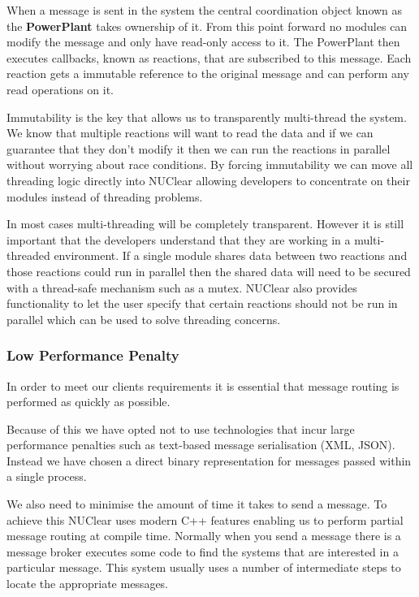 \documentclass[english,12pt]{scrartcl}
\begin{document}
				When a message is sent in the system the central coordination object known as the \textbf{PowerPlant} takes ownership of it. 
				From this point forward no modules can modify the message and only have read-only access to it.
				The PowerPlant then executes callbacks, known as reactions, that are subscribed to this message.
				Each reaction gets a immutable reference to the original message and can perform any read operations on it.
				
				Immutability is the key that allows us to transparently multi-thread the system.
				We know that multiple reactions will want to read the data and if we can guarantee that they don't modify it then we can
				run the reactions in parallel without worrying about race conditions.
				By forcing immutability we can move all threading logic directly into NUClear allowing developers to concentrate on their modules instead of threading problems.
				
				In most cases multi-threading will be completely transparent. 
				However it is still important that the developers understand that they are working in a multi-threaded environment.
				If a single module shares data between two reactions and those reactions could run in parallel then the shared data will
				need to be secured with a thread-safe mechanism such as a mutex.
				NUClear also provides functionality to let the user specify that certain reactions should not be run in parallel which can be used to solve threading concerns.
			
			\subsubsection{Low Performance Penalty}
				In order to meet our clients requirements it is essential that message routing is performed as quickly as possible. 
			
				Because of this we have opted not to use technologies that incur large performance penalties such as text-based message serialisation (XML, JSON).
				Instead we have chosen a direct binary representation for messages passed within a single process. 
				
				We also need to minimise the amount of time it takes to send a message. 
				To achieve this NUClear uses modern C++ features enabling us to perform partial message routing at compile time.
				Normally when you send a message there is a message broker executes some code to find the systems that are interested in a particular message.
				This system usually uses a number of intermediate steps to locate the appropriate messages.
				
\end{document}
